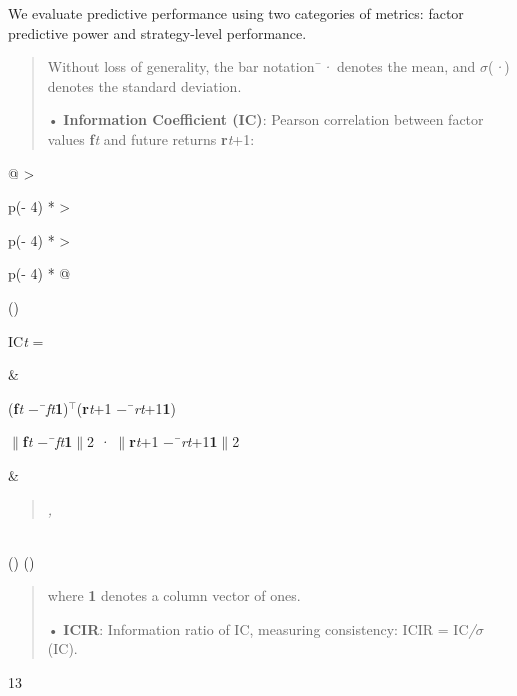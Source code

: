\documentclass[
]{article}
\begin{document}
We evaluate predictive performance using two categories of metrics:
factor predictive power and strategy-level performance.

\begin{quote}
Without loss of generality, the bar notation¯\emph{·} denotes the mean,
and \emph{$\sigma$}(\emph{·}) denotes the standard deviation.

• \textbf{Information Coefficient (IC)}: Pearson correlation between
factor values \textbf{f}\emph{t} and future returns
\textbf{r}\emph{t}+1:
\end{quote}

\begin{longtable}[]{@{}
  >{\raggedright\arraybackslash}p{(\columnwidth - 4\tabcolsep) * }
  >{\raggedright\arraybackslash}p{(\columnwidth - 4\tabcolsep) * }
  >{\raggedright\arraybackslash}p{(\columnwidth - 4\tabcolsep) * }@{}}
\toprule()
\begin{minipage}[b]{\linewidth}\raggedright
IC\emph{t} =
\end{minipage} & \begin{minipage}[b]{\linewidth}\raggedright
(\textbf{f}\emph{t $-$}¯\emph{ft}\textbf{1})\emph{${}^{\top}$}(\textbf{r}\emph{t}+1
\emph{$-$}¯\emph{rt}+1\textbf{1})

\emph{$\|$}\textbf{f}\emph{t $-$}¯\emph{ft}\textbf{1}\emph{$\|$}2 \emph{·
$\|$}\textbf{r}\emph{t}+1 \emph{$-$}¯\emph{rt}+1\textbf{1}\emph{$\|$}2
\end{minipage} & \begin{minipage}[b]{\linewidth}\raggedright
\begin{quote}
\emph{,}
\end{quote}
\end{minipage} \\
\midrule()
\endhead
\bottomrule()
\end{longtable}

\begin{quote}
where \textbf{1} denotes a column vector of ones.

• \textbf{ICIR}: Information ratio of IC, measuring consistency: ICIR =
IC\emph{/$\sigma$}(IC).
\end{quote}

13
\end{document}
